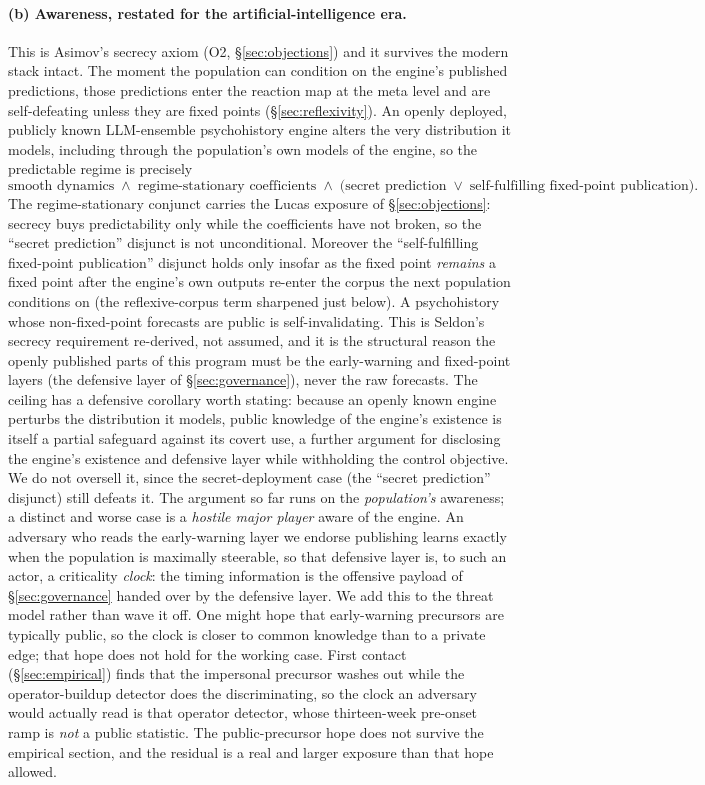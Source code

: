 \documentclass[11pt]{article}
\begin{document}
\paragraph{(b) Awareness, restated for the artificial-intelligence era.} This is Asimov's secrecy axiom (O2, \S\ref{sec:objections}) and it survives the modern stack intact. The moment the population can condition on the engine's published predictions, those predictions enter the reaction map at the meta level and are self-defeating unless they are fixed points (\S\ref{sec:reflexivity}). An openly deployed, publicly known LLM-ensemble psychohistory engine alters the very distribution it models, including through the population's own models of the engine, so the predictable regime is precisely
\[
\text{smooth dynamics} \;\wedge\; \text{regime-stationary coefficients} \;\wedge\; \big(\text{secret prediction} \;\vee\; \text{self-fulfilling fixed-point publication}\big).
\]
The regime-stationary conjunct carries the Lucas exposure of \S\ref{sec:objections}: secrecy buys predictability only while the coefficients have not broken, so the ``secret prediction'' disjunct is not unconditional. Moreover the ``self-fulfilling fixed-point publication'' disjunct holds only insofar as the fixed point \emph{remains} a fixed point after the engine's own outputs re-enter the corpus the next population conditions on (the reflexive-corpus term sharpened just below). A psychohistory whose non-fixed-point forecasts are public is self-invalidating. This is Seldon's secrecy requirement re-derived, not assumed, and it is the structural reason the openly published parts of this program must be the early-warning and fixed-point layers (the defensive layer of \S\ref{sec:governance}), never the raw forecasts. The ceiling has a defensive corollary worth stating: because an openly known engine perturbs the distribution it models, public knowledge of the engine's existence is itself a partial safeguard against its covert use, a further argument for disclosing the engine's existence and defensive layer while withholding the control objective. We do not oversell it, since the secret-deployment case (the ``secret prediction'' disjunct) still defeats it. The argument so far runs on the \emph{population's} awareness; a distinct and worse case is a \emph{hostile major player} aware of the engine. An adversary who reads the early-warning layer we endorse publishing learns exactly when the population is maximally steerable, so that defensive layer is, to such an actor, a criticality \emph{clock}: the timing information is the offensive payload of \S\ref{sec:governance} handed over by the defensive layer. We add this to the threat model rather than wave it off. One might hope that early-warning precursors are typically public, so the clock is closer to common knowledge than to a private edge; that hope does not hold for the working case. First contact (\S\ref{sec:empirical}) finds that the impersonal precursor washes out while the operator-buildup detector does the discriminating, so the clock an adversary would actually read is that operator detector, whose thirteen-week pre-onset ramp is \emph{not} a public statistic. The public-precursor hope does not survive the empirical section, and the residual is a real and larger exposure than that hope allowed.
\end{document}
